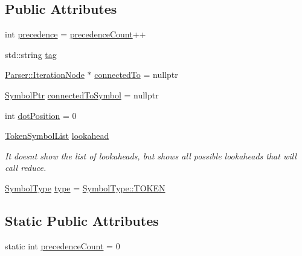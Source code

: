 \subsection*{Public Attributes}
\begin{DoxyCompactItemize}
\item 
int \mbox{\hyperlink{class_erable_1_1_compiler_1_1_symbols_1_1_symbol_aedf7c04582d9fdfdb5a34bc07c6927f9}{precedence}} = \mbox{\hyperlink{class_erable_1_1_compiler_1_1_symbols_1_1_symbol_ac6f3cb75bf61e07c1ff1e7f236d6d1ac}{precedence\+Count}}++
\item 
std\+::string \mbox{\hyperlink{class_erable_1_1_compiler_1_1_symbols_1_1_symbol_a09df8dce9bee3576451b880fc651506d}{tag}}
\item 
\mbox{\hyperlink{struct_erable_1_1_compiler_1_1_parser_1_1_iteration_node}{Parser\+::\+Iteration\+Node}} $\ast$ \mbox{\hyperlink{class_erable_1_1_compiler_1_1_symbols_1_1_symbol_a8fcbecdc112fd91cfec407895a0783ae}{connected\+To}} = nullptr
\item 
\mbox{\hyperlink{namespace_erable_1_1_compiler_1_1_symbols_a8f0bc762f448ea4d84e8713ab3e140b9}{Symbol\+Ptr}} \mbox{\hyperlink{class_erable_1_1_compiler_1_1_symbols_1_1_symbol_a255a19e654587d40b8f78e89fb4e7c73}{connected\+To\+Symbol}} = nullptr
\item 
int \mbox{\hyperlink{class_erable_1_1_compiler_1_1_symbols_1_1_symbol_abf7b881e0a9da479710cdb29133a8936}{dot\+Position}} = 0
\item 
\mbox{\hyperlink{namespace_erable_1_1_compiler_1_1_symbols_aff1ccebebde106c3c5f3cdca118a1d69}{Token\+Symbol\+List}} \mbox{\hyperlink{class_erable_1_1_compiler_1_1_symbols_1_1_symbol_ab5282963b40055e103d9db9b36af2ca0}{lookahead}}
\begin{DoxyCompactList}\small\item\em It doesn\textquotesingle{}t show the list of lookaheads, but shows all possible lookaheads that will call reduce. \end{DoxyCompactList}\item 
\mbox{\hyperlink{namespace_erable_1_1_compiler_1_1_symbols_a3b60ec10cda0920ec4368128361b8320}{Symbol\+Type}} \mbox{\hyperlink{class_erable_1_1_compiler_1_1_symbols_1_1_symbol_adfa63f3bcced8f45df4f4c23df80d97b}{type}} = \mbox{\hyperlink{namespace_erable_1_1_compiler_1_1_symbols_a3b60ec10cda0920ec4368128361b8320a94c8aa2452bccd82ee129b46f7c4be79}{Symbol\+Type\+::\+T\+O\+K\+EN}}
\end{DoxyCompactItemize}
\subsection*{Static Public Attributes}
\begin{DoxyCompactItemize}
\item 
static int \mbox{\hyperlink{class_erable_1_1_compiler_1_1_symbols_1_1_symbol_ac6f3cb75bf61e07c1ff1e7f236d6d1ac}{precedence\+Count}} = 0
\end{DoxyCompactItemize}


